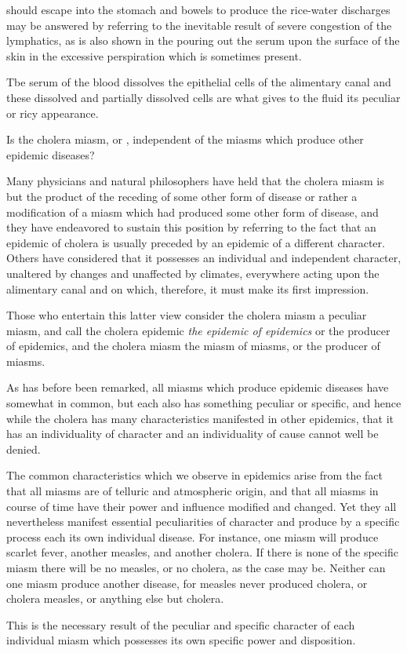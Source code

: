 should escape into the stomach and bowels to produce the rice-water
discharges may be answered by referring to the inevitable result of severe
congestion of the lymphatics, as is also shown in the pouring out the
serum upon the surface of the skin in the excessive perspiration which
is sometimes present.

Tbe serum of the blood dissolves the epithelial cells of the alimentary
canal and these dissolved and partially dissolved cells are what gives to
the fluid its peculiar or ricy appearance.

\vspace{\baselineskip}

Is the cholera miasm, or , independent of the miasms which
produce other epidemic diseases?

Many physicians and natural philosophers have held that the cholera
miasm is but the product of the receding of some other form of disease
or rather a modification of a miasm which had produced some other
form of disease, and they have endeavored to sustain this position by
referring to the fact that an epidemic of cholera is usually preceded by
an epidemic of a different character. Others have considered that it
possesses an individual and independent character, unaltered by changes
and unaffected by climates, everywhere acting upon the alimentary canal
and on which, therefore, it must make its first impression.

Those who entertain this latter view consider the cholera miasm a
peculiar miasm, and call the cholera epidemic \emph{the epidemic of epidemics}
or the producer of epidemics, and the cholera miasm the miasm of
miasms, or the producer of miasms.

As has before been remarked, all miasms which produce epidemic
diseases have somewhat in common, but each also has something peculiar
or specific, and hence while the cholera has many characteristics
manifested in other epidemics, that it has an individuality of character
and an individuality of cause cannot well be denied.

The common characteristics which we observe in epidemics arise
from the fact that all miasms are of telluric and atmospheric origin,
and that all miasms in course of time have their power and influence
modified and changed. Yet they all nevertheless manifest essential
peculiarities of character and produce by a specific process each its own
individual disease. For instance, one miasm will produce scarlet fever,
another measles, and another cholera. If there is none of the specific
miasm there will be no measles, or no cholera, as the case may be.
Neither can one miasm produce another disease, for measles never produced
cholera, or cholera measles, or anything else but cholera.

This is the necessary result of the peculiar and specific character of
each individual miasm which possesses its own specific power and disposition.\endinput